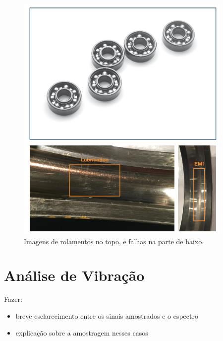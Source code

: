 \begin{figure}[H]
    \caption{Imagens de rolamentos no topo, e falhas na parte de baixo.}
    \begin{center}
        \includegraphics[scale=.5]{referencial/img/bearing_analog_p3.png}
    \end{center}
    \label{fig:}
\end{figure}

% 

\section{Análise de Vibração}\label{sec:}

Fazer:
\begin{itemize}
    \item breve esclarecimento entre os sinais amostrados e o espectro
    \item explicação sobre a amostragem nesses casos
\end{itemize}


